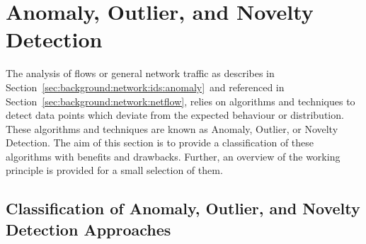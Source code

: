 \section{Anomaly, Outlier, and Novelty Detection}
\label{sec:background:network:novelty}

The analysis of flows or general network traffic as describes in Section~\ref{sec:background:network:ids:anomaly}~and referenced in Section~\ref{sec:background:network:netflow}, relies on algorithms and techniques to detect data points which deviate from the expected behaviour or distribution. These algorithms and techniques are known as Anomaly, Outlier, or Novelty Detection.
The aim of this section is to provide a classification of these algorithms with benefits and drawbacks.
Further, an overview of the working principle is provided for a small selection of them.

\subsection[Classification of Anomaly, Outlier, and Novelty Detection]{Classification of Anomaly, Outlier, and Novelty Detection Approaches}
\label{sec:background:network:novelty:class}

